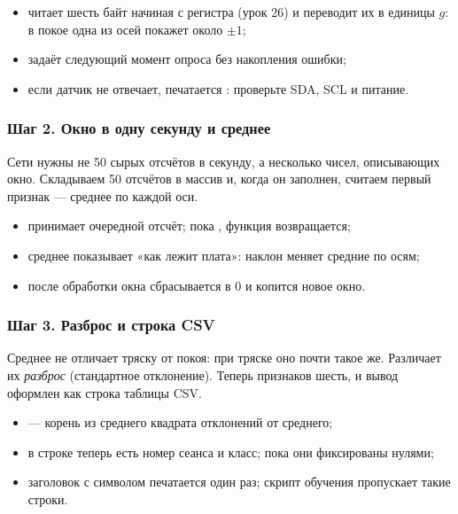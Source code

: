 \begin{itemize}[leftmargin=*]
  \item {} читает шесть байт начиная с регистра  (урок 26) и переводит их в
        единицы $g$: в покое одна из осей покажет около $\pm1$;
  \item {} задаёт следующий момент опроса без накопления ошибки;
  \item если датчик не отвечает, печатается : проверьте SDA, SCL и питание.
\end{itemize}

\subsubsection{Шаг 2. Окно в одну секунду и среднее}

Сети нужны не 50 сырых отсчётов в секунду, а несколько чисел, описывающих окно. Складываем 50 отсчётов в
массив  и, когда он заполнен, считаем первый признак --- среднее по каждой оси.


\begin{itemize}[leftmargin=*]
  \item {} принимает очередной отсчёт; пока , функция возвращается;
  \item среднее показывает «как лежит плата»: наклон меняет средние по осям;
  \item после обработки окна  сбрасывается в 0 и копится новое окно.
\end{itemize}

\subsubsection{Шаг 3. Разброс и строка CSV}

Среднее не отличает тряску от покоя: при тряске оно почти такое же. Различает их \emph{разброс}
(стандартное отклонение). Теперь признаков шесть, и вывод оформлен как строка таблицы CSV.


\begin{itemize}[leftmargin=*]
  \item {} --- корень из среднего квадрата отклонений от среднего;
  \item в строке теперь есть номер сеанса и класс; пока они фиксированы нулями;
  \item заголовок с символом \code{\#} печатается один раз; скрипт обучения пропускает такие строки.
\end{itemize}

